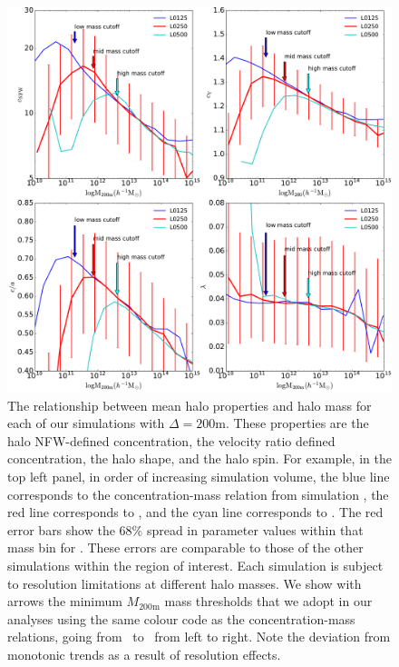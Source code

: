 \documentclass[usenatbib,fleqn]{mnras}
\begin{document}
\begin{figure}
\centering
\includegraphics[width=\textwidth]{masscuts_d200.pdf}
\caption{
The relationship between mean halo properties and halo mass for each of our simulations with $\Delta =200$m. These properties are the halo NFW-defined concentration, the velocity ratio defined concentration, the halo shape, and the halo spin. For example, in the top left panel, in order of increasing simulation volume, the blue line corresponds to the concentration-mass relation from simulation \simA, the red line corresponds to \simB, and the cyan line corresponds to \simC. The red error bars show the 68\% spread in parameter values within that mass bin for \simB. These errors are comparable to those of the other simulations within the region of interest. Each simulation is subject to resolution limitations at different halo masses. We show with arrows the minimum $M_{200\text{m}}$ mass thresholds that we adopt in our analyses using the same colour code as the concentration-mass relations, going from \simA \ to \simC \ from left to right. Note the deviation from monotonic trends as a result of resolution effects.
}
\label{fig:massrelation}
\end{figure}
\end{document}
